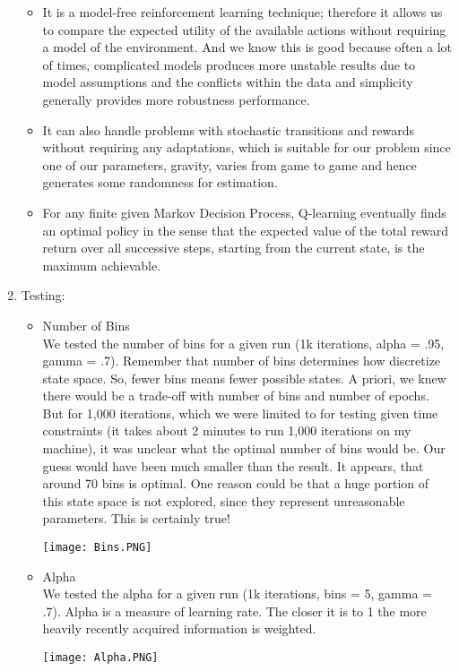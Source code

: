 \documentclass[12pt]{article}
\newcommand\tab[1][0.5cm]{\hspace*{#1}}
\begin{document}
\begin{enumerate}
\begin{itemize}
	\item  
		 It is a model-free reinforcement learning technique; therefore it allows us to compare the expected utility of the available actions without requiring a model of the environment. And we know this is good because often a lot of times, complicated models produces more unstable results due to model assumptions and the conflicts within the data and simplicity generally provides more robustness performance.\\
	
	\item  
		 It can also handle problems with stochastic transitions and rewards without requiring any adaptations, which is suitable for our problem since one of our parameters, gravity, varies from game to game and hence generates some randomness for estimation.\\
	
	\item 
		For any finite given Markov Decision Process, Q-learning eventually finds an optimal policy in the sense that the expected value of the total reward return over all successive steps, starting from the current state, is the maximum achievable. \\
\end{itemize}

\item
Testing:

\begin{itemize}
	\item Number of Bins \\
		\tab We tested the number of bins for a given run (1k iterations, alpha = .95, gamma = .7). Remember that number of bins determines how discretize state space.  So, fewer bins means fewer possible states.  A priori, we knew there would be a trade-off with number of bins and number of epochs.  But for 1,000 iterations, which we were limited to for testing given time constraints (it takes about 2 minutes to run 1,000 iterations on my machine), it was unclear what the optimal number of bins would be.  Our guess would have been much smaller than the result.  It appears, that around 70 bins is optimal.  One reason could be that a huge portion of this state space is not explored, since they represent unreasonable parameters. This is certainly true!
			\begin{center} \texttt{[image: Bins.PNG]} \end{center}
	
	\item Alpha \\
		\tab We tested the alpha for a given run (1k iterations, bins = 5, gamma = .7).  Alpha is a measure of learning rate.  The closer it is to 1 the more heavily recently acquired information is weighted. 
			\begin{center} \texttt{[image: Alpha.PNG]} \end{center}
	

\end{itemize}
\end{enumerate}
\end{document}
